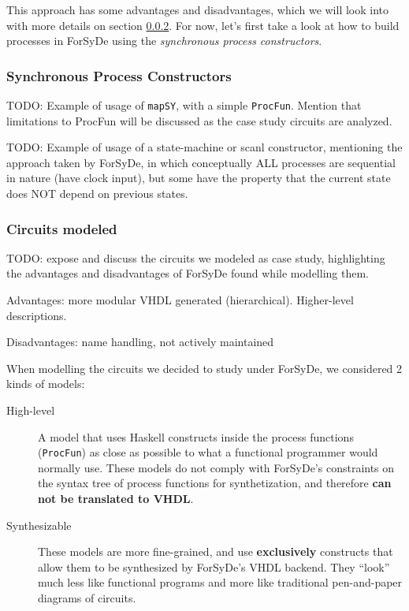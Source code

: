 \documentclass[a4paper]{article}
\begin{document}
                This approach has some advantages and disadvantages, which we will look into with
                more details on section \ref{subsubsec:forsyde-circuits}. For now, let's first take
                a look at how to build processes in ForSyDe using the \emph{synchronous process
                    constructors}.

            \subsubsection{Synchronous Process Constructors}
            \label{subsubsec:forsyde-synchprocs}
                TODO: Example of usage of \texttt{mapSY}, with a simple \texttt{ProcFun}. Mention
                that limitations to ProcFun will be discussed as the case study circuits are
                analyzed.

                TODO: Example of usage of a state-machine or scanl constructor, mentioning the
                approach taken by ForSyDe, in which conceptually ALL processes are sequential in
                nature (have clock input), but some have the property that the current state does
                NOT depend on previous states.


            \subsubsection{Circuits modeled}
            \label{subsubsec:forsyde-circuits}
                TODO: expose and discuss the circuits we modeled as case study, highlighting the
                advantages and disadvantages of ForSyDe found while modelling them.

                Advantages: more modular VHDL generated (hierarchical). Higher-level descriptions.

                Disadvantages: name handling, not actively maintained

                When modelling the circuits we decided to study under ForSyDe, we considered 2 kinds
                of models:
                \begin{description}
                    \item[High-level] A model that uses Haskell constructs inside the process
                        functions (\texttt{ProcFun}) as close as possible to what
                        a functional programmer would normally use. These models do not comply with
                        ForSyDe's constraints on the syntax tree of process functions for
                        synthetization, and therefore \textbf{can not be translated to VHDL}.

                    \item[Synthesizable] These models are more fine-grained, and use
                        \textbf{exclusively} constructs that allow them to be synthesized by
                        ForSyDe's VHDL backend. They ``look'' much less like functional programs and
                        more like traditional pen-and-paper diagrams of circuits.
                \end{description}
\end{document}
